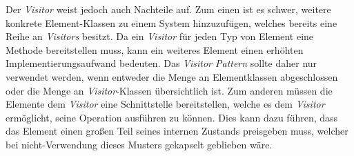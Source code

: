 Der \emph{Visitor} weist jedoch auch Nachteile auf. Zum einen ist es schwer, weitere konkrete Element-Klassen zu einem System hinzuzufügen, welches bereits eine Reihe an \emph{Visitors} besitzt. Da ein \emph{Visitor} für jeden Typ von Element eine Methode bereitstellen muss, kann ein weiteres Element einen erhöhten Implementierungsaufwand bedeuten. Das \emph{Visitor Pattern} sollte daher nur verwendet werden, wenn entweder die Menge an Elementklassen abgeschlossen oder die Menge an \emph{Visitor}-Klassen übersichtlich ist. Zum anderen müssen die Elemente dem \emph{Visitor} eine Schnittstelle bereitstellen, welche es dem \emph{Visitor} ermöglicht, seine Operation ausführen zu können. Dies kann dazu führen, dass das Element einen großen Teil seines internen Zustands preisgeben muss, welcher bei nicht-Verwendung dieses Musters gekapselt geblieben wäre. \cite{gamma_design_1995}